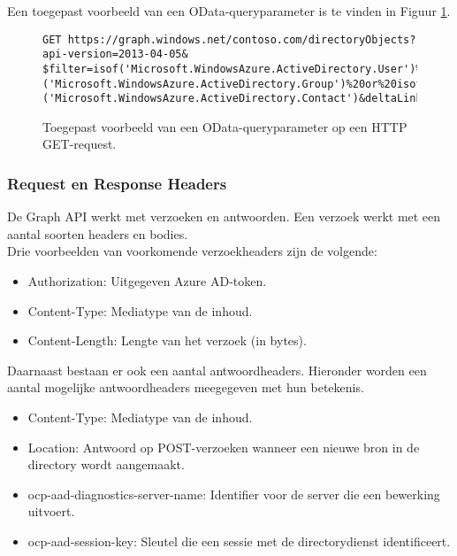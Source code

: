 Een toegepast voorbeeld van een OData-queryparameter is te vinden in Figuur \ref{odqp}. \\

\begin{figure}[h]
\footnotesize\begin{verbatim}GET https://graph.windows.net/contoso.com/directoryObjects?api-version=2013-04-05&
$filter=isof('Microsoft.WindowsAzure.ActiveDirectory.User')%20or%20isof
('Microsoft.WindowsAzure.ActiveDirectory.Group')%20or%20isof
('Microsoft.WindowsAzure.ActiveDirectory.Contact')&deltaLink=HTTP/1.1
\end{verbatim}    
\caption[Voorbeeld OData-queryparamter]{Toegepast voorbeeld van een OData-queryparameter op een \ac{HTTP} GET-request.}
\label{odqp}
\end{figure}

\subsubsection{Request en Response Headers}


De Graph \ac{API} werkt met verzoeken en antwoorden. Een verzoek werkt met een aantal soorten headers en bodies. \\

Drie voorbeelden van voorkomende verzoekheaders zijn de volgende:

\begin{itemize}
    \item Authorization: Uitgegeven Azure \ac{AD}-token.
    \item Content-Type: Mediatype van de inhoud.
    \item Content-Length: Lengte van het verzoek (in bytes).
\end{itemize} 

Daarnaast bestaan er ook een aantal antwoordheaders. Hieronder worden een aantal mogelijke antwoordheaders meegegeven met hun betekenis.

\begin{itemize}
    \item Content-Type: Mediatype van de inhoud.
    \item Location: Antwoord op POST-verzoeken wanneer een nieuwe bron in de directory wordt aangemaakt.
    \item ocp-aad-diagnostics-server-name: Identifier voor de server die een bewerking uitvoert.
    \item ocp-aad-session-key: Sleutel die een sessie met de directorydienst identificeert.
\end{itemize}

